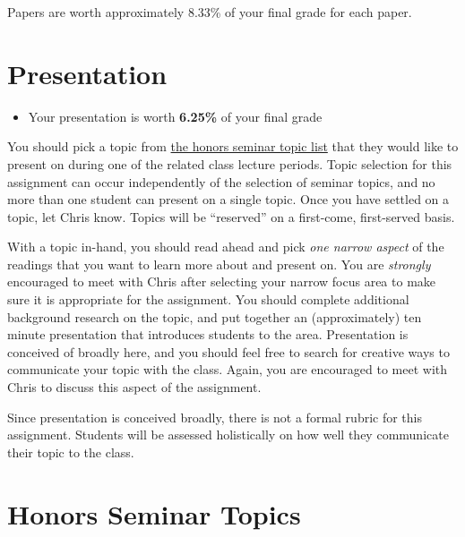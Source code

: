 \documentclass[]{book}
\newenvironment{rmdblock}[1]
  {\begin{shaded*}
  \begin{itemize}
  \renewcommand{\labelitemi}{
    \raisebox{-.7\height}[0pt][0pt]{
      {\setkeys{Gin}{width=3em,keepaspectratio}\texttt{[image: images/\#1]}}
    }
  }
  \item
  }
  {
  \end{itemize}
  \end{shaded*}
  }
\newenvironment{rmdtip}
  {\begin{rmdblock}{tip}}
  {\end{rmdblock}}
\theoremstyle{definition}
\theoremstyle{definition}
\theoremstyle{definition}
\theoremstyle{remark}
\begin{document}
Papers are worth approximately 8.33\% of your final grade for each
paper.

\hypertarget{presentation}{%
\section{Presentation}\label{presentation}}

\begin{rmdtip}
Your presentation is worth \textbf{6.25\%} of your final grade
\end{rmdtip}

You should pick a topic from \href{/honors-seminar-topics.html}{the
honors seminar topic list} that they would like to present on during one
of the related class lecture periods. Topic selection for this
assignment can occur independently of the selection of seminar topics,
and no more than one student can present on a single topic. Once you
have settled on a topic, let Chris know. Topics will be ``reserved'' on
a first-come, first-served basis.

With a topic in-hand, you should read ahead and pick \emph{one narrow
aspect} of the readings that you want to learn more about and present
on. You are \emph{strongly} encouraged to meet with Chris after
selecting your narrow focus area to make sure it is appropriate for the
assignment. You should complete additional background research on the
topic, and put together an (approximately) ten minute presentation that
introduces students to the area. Presentation is conceived of broadly
here, and you should feel free to search for creative ways to
communicate your topic with the class. Again, you are encouraged to meet
with Chris to discuss this aspect of the assignment.

Since presentation is conceived broadly, there is not a formal rubric
for this assignment. Students will be assessed holistically on how well
they communicate their topic to the class.

\hypertarget{honors-seminar-topics}{%
\section{Honors Seminar Topics}\label{honors-seminar-topics}}
\end{document}
